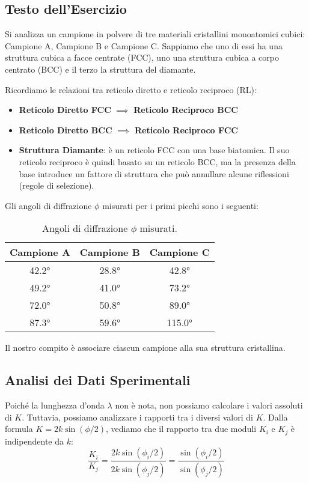 \subsection{Testo dell'Esercizio}

Si analizza un campione in polvere di tre materiali cristallini monoatomici cubici: Campione A, Campione B e Campione C. Sappiamo che uno di essi ha una struttura cubica a facce centrate (FCC), uno una struttura cubica a corpo centrato (BCC) e il terzo la struttura del diamante.

Ricordiamo le relazioni tra reticolo diretto e reticolo reciproco (RL):
\begin{itemize}
    \item \textbf{Reticolo Diretto FCC} $\implies$ \textbf{Reticolo Reciproco BCC}
    \item \textbf{Reticolo Diretto BCC} $\implies$ \textbf{Reticolo Reciproco FCC}
    \item \textbf{Struttura Diamante}: è un reticolo FCC con una base biatomica. Il suo reticolo reciproco è quindi basato su un reticolo BCC, ma la presenza della base introduce un fattore di struttura che può annullare alcune riflessioni (regole di selezione).
\end{itemize}

Gli angoli di diffrazione $\phi$ misurati per i primi picchi sono i seguenti:

\begin{table}[h!]
\centering
\begin{tabular}{|c|c|c|}
\hline
\textbf{Campione A} & \textbf{Campione B} & \textbf{Campione C} \\
\hline
42.2° & 28.8° & 42.8° \\
49.2° & 41.0° & 73.2° \\
72.0° & 50.8° & 89.0° \\
87.3° & 59.6° & 115.0° \\
\hline
\end{tabular}
\caption{Angoli di diffrazione $\phi$ misurati.}
\end{table}

Il nostro compito è associare ciascun campione alla sua struttura cristallina.

\subsection{Analisi dei Dati Sperimentali}

Poiché la lunghezza d'onda $\lambda$ non è nota, non possiamo calcolare i valori assoluti di $K$. Tuttavia, possiamo analizzare i rapporti tra i diversi valori di $K$. Dalla formula $K = 2k \sin(\phi/2)$, vediamo che il rapporto tra due moduli $K_i$ e $K_j$ è indipendente da $k$:
$$ \frac{K_i}{K_j} = \frac{2k \sin(\phi_i/2)}{2k \sin(\phi_j/2)} = \frac{\sin(\phi_i/2)}{\sin(\phi_j/2)} $$

